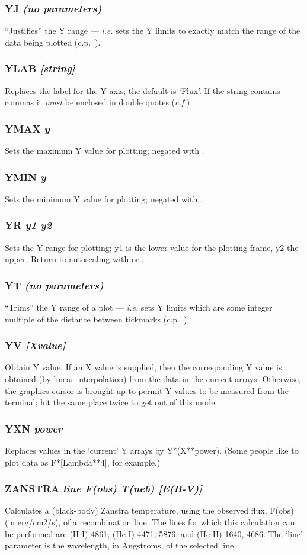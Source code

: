 \documentclass[twoside,11pt,noabs,nolof]{starlink}
\providecommand{\dipcom}[3]{\subsubsection*{\label{COM:#1}\textbf{#1} \emph{#2}}}
\begin{document}
\dipcom{YJ}{(no parameters)}{Sets Y limits to match exactly the range of the data being plotted}
``Justifies'' the Y range --- \emph{i.e.} sets the Y limits to exactly
match the range of the data being plotted (c.p.\ ).

\dipcom{YLAB}{[string]}{Sets the label for the Y axis}
Replaces the label for the Y axis; the default is `Flux'. If the
string contains commas it \emph{must} be enclosed in double quotes
(\textit{c.f} ).

\dipcom{YMAX}{y}{Sets the maximum Y value to be plotted}
Sets the maximum Y value for plotting; negated with .

\dipcom{YMIN}{y}{Sets the minimum Y value to be plotted}
Sets the minimum Y value for plotting; negated with .

\dipcom{YR}{y1 y2}{Sets the minimum and maximum Y value to be plotted}
Sets the Y range for plotting; y1 is the lower value for the plotting
frame, y2 the upper. Return to autoscaling with   or .

\dipcom{YT}{(no parameters)}{Trims the Y range to the nearest tick marks}
``Trims'' the Y range of a plot --- \emph{i.e.} sets Y limits which are
some integer multiple of the distance between tickmarks (c.p.\ ).

\dipcom{YV}{[Xvalue]}{Obtains Y values using the cursor}
Obtain Y value. If an X value is supplied, then the corresponding Y
value is obtained (by linear interpolation) from the data in the
current arrays. Otherwise, the graphics cursor is brought up to permit
Y values to be measured from the terminal; hit the same place twice to
get out of this mode.

\dipcom{YXN}{power}{Replaces Y values in the current arrays by Y*(X**power)}
Replaces values in the `current' Y arrays by Y*(X**power). (Some
people like to plot data as F*[Lambda**4], for example.)

\dipcom{ZANSTRA}{line F(obs) T(neb) [E(B-V)]}{Calculates a Zanstra temperature given a re-combination line flux}
Calculates a (black-body) Zanstra temperature, using the observed
flux, F(obs) \newline (in erg/cm2/s), of a recombination line. The
lines for which this calculation can be performed are (H I) 4861; (He
I) 4471, 5876; and (He II) 1640, 4686. The `line' parameter is the
wavelength, in Angstroms, of the selected line.
\end{document}
